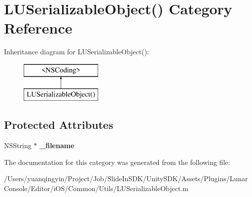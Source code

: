 \hypertarget{category_l_u_serializable_object_07_08}{}\section{L\+U\+Serializable\+Object() Category Reference}
\label{category_l_u_serializable_object_07_08}
Inheritance diagram for L\+U\+Serializable\+Object()\+:\begin{figure}[H]
\begin{center}
\leavevmode
\includegraphics[height=2.000000cm]{category_l_u_serializable_object_07_08}
\end{center}
\end{figure}
\subsection*{Protected Attributes}
\begin{DoxyCompactItemize}
\item 
\mbox{\label{category_l_u_serializable_object_07_08_ac442c456b58c8698868a36a5696de3f4}} 
N\+S\+String $\ast$ {\bfseries \+\_\+filename}
\end{DoxyCompactItemize}


The documentation for this category was generated from the following file\+:\begin{DoxyCompactItemize}
\item 
/\+Users/yuanqingyin/\+Project/\+Job/\+Slide\+In\+S\+D\+K/\+Unity\+S\+D\+K/\+Assets/\+Plugins/\+Lunar\+Console/\+Editor/i\+O\+S/\+Common/\+Utils/L\+U\+Serializable\+Object.\+m\end{DoxyCompactItemize}
